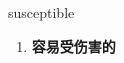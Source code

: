 
\begin{frame}
{\huge susceptible}
\begin{center}
\begin{enumerate}\Large
  \item \textbf{容易受伤害的}
\end{enumerate}
\end{center}
\end{frame}
